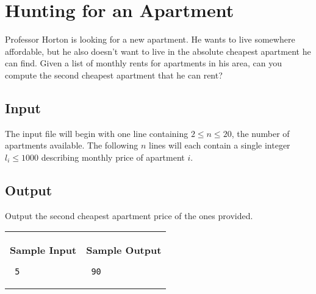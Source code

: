 \documentclass[11pt]{article}
\begin{document}
\section*{Hunting for an Apartment}


\begin{wrapfigure}{r}{3in}
\vspace{-10pt}
\vspace{-30pt}
\end{wrapfigure}

Professor Horton is looking for a new apartment. He wants to live somewhere affordable, but he also doesn't want to live in the absolute cheapest apartment he can find. Given a list of monthly rents for apartments in his area, can you compute the second cheapest apartment that he can rent?

\subsection*{Input}
The input file will begin with one line containing $2 \leq n \leq 20$, the number of apartments available. The following $n$ lines will each contain a single integer $l_i \leq 1000$ describing monthly price of apartment $i$.

\subsection*{Output}
Output the second cheapest apartment price of the ones provided.



\vspace{0.25in}\hspace{-0.3in}\begin{tabular}{ll}

\parbox{3in}{{\large\bf Sample Input}

\vspace{0.15in}

{\tt 
5
}
}

&

\parbox{3in}{{\large\bf Sample Output}

\vspace{0.15in}

{\tt
90
}
}

\\
\end{tabular}
\end{document}
